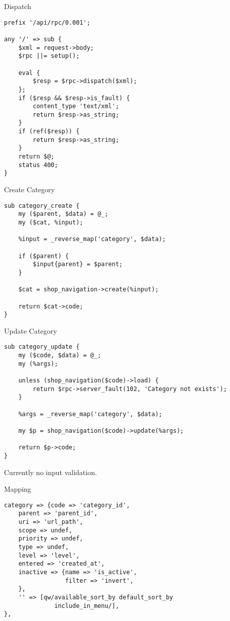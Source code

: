 \begin{frame}[fragile]{Dispatch}
\begin{lstlisting}
prefix '/api/rpc/0.001';

any '/' => sub {
    $xml = request->body;
    $rpc ||= setup();

    eval {
        $resp = $rpc->dispatch($xml);
    };
    if ($resp && $resp->is_fault) {
        content_type 'text/xml';
        return $resp->as_string;
    }
    if (ref($resp)) {
        return $resp->as_string;
    }
    return $@;    
    status 400;
}
\end{lstlisting}
\end{frame}

\begin{frame}[fragile]{Create Category}
\begin{lstlisting}
sub category_create {
    my ($parent, $data) = @_;
    my ($cat, %input);

    %input = _reverse_map('category', $data);

    if ($parent) {
        $input{parent} = $parent;
    }

    $cat = shop_navigation->create(%input);

    return $cat->code;
}
\end{lstlisting}
\end{frame}

\begin{frame}[fragile]{Update Category}
\begin{lstlisting}
sub category_update {
    my ($code, $data) = @_;
    my (%args);

    unless (shop_navigation($code)->load) {
        return $rpc->server_fault(102, 'Category not exists');
    }

    %args = _reverse_map('category', $data);

    my $p = shop_navigation($code)->update(%args);

    return $p->code;
}
\end{lstlisting}
\end{frame}

Currently no input validation.

\begin{frame}[fragile]{Mapping}
\begin{lstlisting}
category => {code => 'category_id',
    parent => 'parent_id',
    uri => 'url_path',
    scope => undef,
    priority => undef,
    type => undef,
    level => 'level',
    entered => 'created_at',
    inactive => {name => 'is_active',
                 filter => 'invert',
    },
    '' => [qw/available_sort_by default_sort_by 
              include_in_menu/],
},
\end{lstlisting}
\end{frame}

